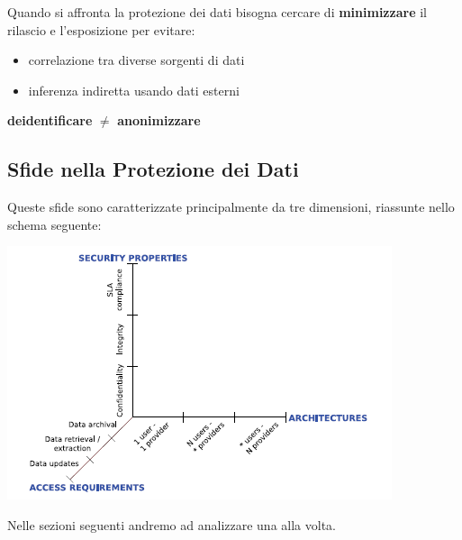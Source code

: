 Quando si affronta la protezione dei dati bisogna cercare di \textbf{minimizzare} il rilascio e l'esposizione per evitare:
\begin{itemize}
    \item correlazione tra diverse sorgenti di dati
    \item inferenza indiretta usando dati esterni
\end{itemize}
\begin{center}
    \textbf{deidentificare} \( \neq \) \textbf{anonimizzare}
\end{center}

\subsection{Sfide nella Protezione dei Dati}
Queste sfide sono caratterizzate principalmente da tre dimensioni, riassunte nello schema seguente:
\begin{center}
    \includegraphics[scale=0.7]{img/secchall.png}
\end{center}
Nelle sezioni seguenti andremo ad analizzare una alla volta.

